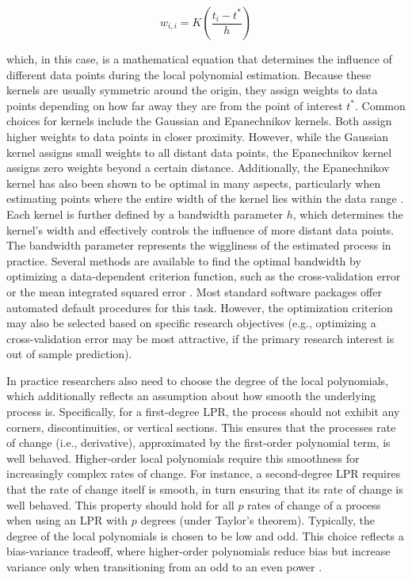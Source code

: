 \documentclass[man, floatsintext]{apa7}
\begin{document}
\begin{equation}
  w_{i, i} = K(\frac{t_i - t^*}{h})
\end{equation}

\noindent which, in this case, is a mathematical equation that determines the
influence of different data points during the local polynomial estimation.
Because these kernels are usually symmetric around the origin, they assign
weights to data points depending on how far away they are from the point of
interest $t^*$. Common choices for kernels include the Gaussian and
Epanechnikov kernels. Both assign higher weights to data points in closer
proximity. However, while the Gaussian kernel assigns small weights to all
distant data points, the Epanechnikov kernel assigns zero weights beyond a
certain distance. Additionally, the Epanechnikov kernel has also been shown to
be optimal in many aspects, particularly when estimating points where the
entire width of the kernel lies within the data range
\parencite{fan_local_1997}. Each kernel is further defined by a bandwidth
parameter $h$, which determines the kernel's width and effectively controls the
influence of more distant data points. The bandwidth parameter represents the
wiggliness of the estimated process in practice. Several methods are available
to find the optimal bandwidth by optimizing a data-dependent criterion
function, such as the cross-validation error or the mean integrated squared
error \parencite{kohler_review_2014, debruyne_model_2008}. Most standard
software packages offer automated default procedures for this task. However,
the optimization criterion may also be selected based on specific research
objectives (e.g., optimizing a cross-validation error may be most attractive,
if the primary research interest is out of sample prediction).

In practice researchers also need to choose the degree of the local
polynomials, which additionally reflects an assumption about how smooth the
underlying process is. Specifically, for a first-degree LPR, the process should
not exhibit any corners, discontinuities, or vertical sections. This ensures
that the processes rate of change (i.e., derivative), approximated by the
first-order polynomial term, is well behaved. Higher-order local polynomials
require this smoothness for increasingly complex rates of change. For instance,
a second-degree LPR requires that the rate of change itself is smooth, in turn
ensuring that its rate of change is well behaved. This property should hold for
all $p$ rates of change of a process when using an LPR with $p$ degrees (under
Taylor's theorem). Typically, the degree of the local polynomials is chosen to
be low and odd. This choice reflects a bias-variance tradeoff, where
higher-order polynomials reduce bias but increase variance only when
transitioning from an odd to an even power
\parencite{ruppert_multivariate_1994}.
\end{document}
